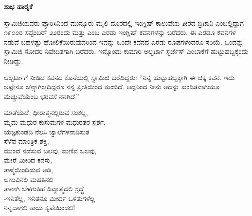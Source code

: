 \begin{myquote}
\end{myquote}

\begin{flushright}
\end{flushright}

\selectkan

\begin{center}
\textbf{ಶುಭ ಹಾರೈಕೆ}
\end{center}

ಸ್ವಾಮಿಜಿಯವರು ಪ್ಯಾರಿಸಿನಿಂದ ಮುನ್ನೂರು ಮೈಲಿ ದೂರದಲ್ಲಿ ಇಂಗ್ಲಿಷ್ ಕಾಲುವೆಯ ತೀರದ ಬ್ರಿಟಾನಿ ಎಂಬಲ್ಲಿದ್ದಾಗ ೧೯೦೦ರ ಸಪ್ಟೆಂಬರ್ ೨೨ರಂದು  ಮತ್ತು  ಎಂಬ ಎರಡು ಇಂಗ್ಲಿಷ್ ಕವನಗಳನ್ನು ಬರೆದರು. ಈ ಎರಡೂ ಕವನಗಳ ನಡುವೆ ಬಹಳಷ್ಟು ಹೋಲಿಕೆಯಿರುವುದರಿಂದ ಇವನ್ನು ಒಂದೇ ಕವನದ ಎರಡು ರೂಪಗಳೆಂದರೂ ಸರಿಯೆ. ಒಂದನ್ನು ಸ್ವಾಮಿಜಿ ಸೋದರಿ ನಿವೇದಿತಗಾಗಿ ಬರೆದರು. ಇನ್ನೊಂದು ಕುಮಾರಿ ಅಲ್ಬರ್ಟಾ ಸ್ಟರ್ಜೆಸ್ ಎಂಬಾಕೆಗೆ ಹುಟ್ಟುಹಬ್ಬಕ್ಕೆಂದು ನೀಡಿದ್ದು.

ಆಲ್ಬರ್ಟಾಗೆ ನೀಡಿದ ಕವನದ ಕೊನೆಯಲ್ಲಿ ಸ್ವಾಮಿಜಿ ಬರೆದಿದ್ದರು: “ನಿನ್ನ ಹುಟ್ಟುಹಬ್ಬಕ್ಕಾಗಿ ಈ ಚಿಕ್ಕ ಕವನ. ಇದು ಅಷ್ಟೇನೂ ಚೆನ್ನಾಗಿಲ್ಲದಿದ್ದರೂ ನನ್ನ ಪ್ರೀತಿಯಿಂದ ತುಂಬಿದೆ. ಆದ್ದರಿಂದ ನೀನು ಅದನ್ನು ಖಂಡಿತವಾಗಿಯೂ ಮೆಚ್ಚುವೆಯೆಂಬ ಭರವಸೆ ನನಗಿದೆ.”

\begin{myquote}
ಮಾತೆಯೆದೆ, ಧೀರಾತ್ಮನಲ್ಲಿರುವ ಸಂಕಲ್ಪ,\\ಮೃದು ಮಧುರ ಕುಸುಮಗಳ ಮಧುರತರ ಸ್ಪರ್ಶ,\\ಯಜ್ಞಕುಂಡದಿ ನೆಲಸಿ ಜ್ವಾಲೆಗಳನಾಡಿಸುತ\\ಸೆಳೆವ ಮಾಂತ್ರಿಕ ಶಕ್ತಿ,\\ಮುಂದೆ ನಡೆಸುವ ಬಲವು, ಮಣಿವ ಒಲವು,\\ಮೇರೆ ಮೀರಿದ ಕನಸು,\\ತಾಳ್ಮೆಯಿಂದಿಡುವ ಅಡಿ,\\ಅಣುವಿನಲಿ ಮಹತಿನಲಿ\\ತಾನಾಗಿ ಬೆಳಗುತಿಹ ದಿವ್ಯಾತ್ಮದಲಿ ಶ್ರದ್ಧೆ\\-ಇನಿತೆಲ್ಲ, ಇನಿತನೂ ಮೀರ್ದ ಒಳಿತುಗಳೆಲ್ಲ\\ನಿನ್ನದಾಗಲಿ ತಾಯ ಕೃಪೆಯಿಂದಲಿ!
\end{myquote}

